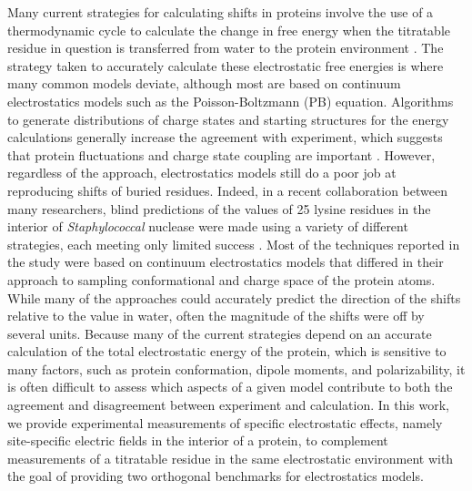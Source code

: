 Many current strategies for calculating \pKa{} shifts in proteins involve the use of a thermodynamic cycle to calculate the change in free energy when the titratable residue in question is transferred from water to the protein environment \cite{Fogolari2002, Gorham2011, Getahun2003}.
The strategy taken to accurately calculate these electrostatic free energies is where many common models deviate, although most are based on continuum electrostatics models such as the Poisson-Boltzmann (PB) equation. 
Algorithms to generate distributions of charge states and starting structures for the energy calculations generally increase the agreement with experiment, which suggests that protein fluctuations and charge state coupling are important \cite{Witham2011, Meyer2015}.
However, regardless of the approach, electrostatics models still do a poor job at reproducing \pKa{} shifts of buried residues. 
Indeed, in a recent collaboration between many researchers, blind predictions of the \pKa{} values of 25 lysine residues in the interior of \emph{Staphylococcal} nuclease were made using a variety of different strategies, each meeting only limited success \cite{Nielsen2011, Alexov2011}.
Most of the techniques reported in the study were based on continuum electrostatics models that differed in their approach to sampling conformational and charge space of the protein atoms. 
While many of the approaches could accurately predict the direction of the \pKa{} shifts relative to the value in water, often the magnitude of the \pKa{} shifts were off by several \pKa{} units. 
Because many of the current strategies depend on an accurate calculation of the total electrostatic energy of the protein, which is sensitive to many factors, such as protein conformation, dipole moments, and polarizability, it is often difficult to assess which aspects of a given model contribute to both the agreement and disagreement between experiment and calculation. 
In this work, we provide experimental measurements of specific electrostatic effects, namely site-specific electric fields in the interior of a protein, to complement \pKa{} measurements of a titratable residue in the same electrostatic environment with the goal of providing two orthogonal benchmarks for electrostatics models.

